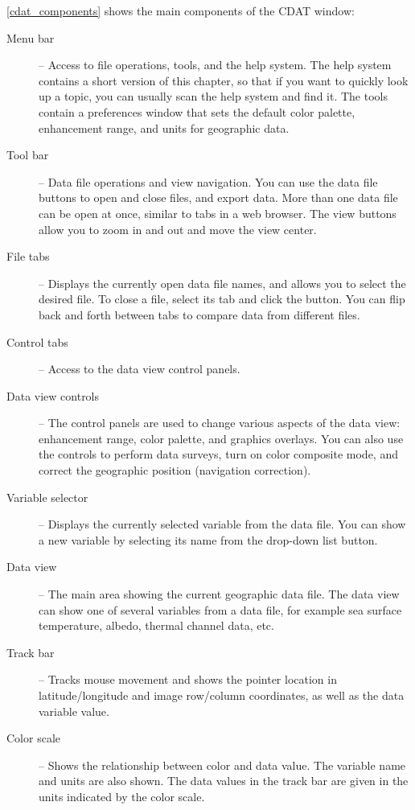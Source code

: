 \autoref{cdat_components} shows the main components of the CDAT
window:
\begin{description}

\item[Menu bar] -- Access to file operations, tools, and the help
system.  The help system contains a short version of this
chapter, so that if you want to quickly look up a topic, you can
usually scan the help system and find it.  The tools contain a
preferences window that sets the default color palette,
enhancement range, and units for geographic data.

\item[Tool bar] -- Data file operations and view navigation.  You
can use the data file buttons to open and close files, and export
data.  More than one data file can be open at once, similar to
tabs in a web browser.  The view buttons allow you to zoom in and
out and move the view center.

\item[File tabs] -- Displays the currently open data file names,
and allows you to select the desired file.  To close a file,
select its tab and click the  button.  You
can flip back and forth between tabs to compare data from
different files.

\item[Control tabs] -- Access to the data view control panels.

\item[Data view controls] -- The control panels are used to change
various aspects of the data view: enhancement range, color
palette, and graphics overlays.  You can also use the controls to
perform data surveys, turn on color composite mode, and correct
the geographic position (navigation correction).

\item[Variable selector] -- Displays the currently selected variable from
the data file.  You can show a new variable by selecting its name from
the drop-down list button.

\item[Data view] -- The main area showing the current geographic
data file.  The data view can show one of several variables from
a data file, for example sea surface temperature, albedo, thermal
channel data, etc.  

\item[Track bar] -- Tracks mouse movement and shows the pointer
location in latitude/longitude and image row/column coordinates,
as well as the data variable value.

\item[Color scale] -- Shows the relationship between color and data
value.  The variable name and units are also shown.  The data
values in the track bar are given in the units indicated by the
color scale.

\end{description}

